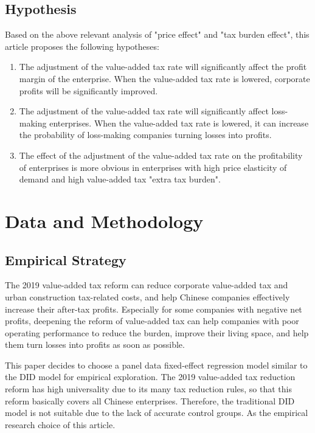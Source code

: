\documentclass[3p,times]{elsarticle}
\begin{document}
\subsection{Hypothesis}
Based on the above relevant analysis of "price effect" and "tax burden effect", this article proposes the following hypotheses:
\begin{enumerate}[label={\textbf{H\arabic*}:}]
    \item The adjustment of the value-added tax rate will significantly affect the profit margin of the enterprise. When the value-added tax rate is lowered, corporate profits will be significantly improved.
    \item The adjustment of the value-added tax rate will significantly affect loss-making enterprises. When the value-added tax rate is lowered, it can increase the probability of loss-making companies turning losses into profits.
    \item The effect of the adjustment of the value-added tax rate on the profitability of enterprises is more obvious in enterprises with high price elasticity of demand and high value-added tax "extra tax burden".
\end{enumerate}

\section{Data and Methodology}
\subsection{Empirical Strategy}
The 2019 value-added tax reform can reduce corporate value-added tax and urban construction tax-related costs, and help Chinese companies effectively increase their after-tax profits. Especially for some companies with negative net profits, deepening the reform of value-added tax can help companies with poor operating performance to reduce the burden, improve their living space, and help them turn losses into profits as soon as possible.

This paper decides to choose a panel data fixed-effect regression model similar to the DID model for empirical exploration. The 2019 value-added tax reduction reform has high universality due to its many tax reduction rules, so that this reform basically covers all Chinese enterprises. Therefore, the traditional DID model is not suitable due to the lack of accurate control groups. As the empirical research choice of this article.
\end{document}
